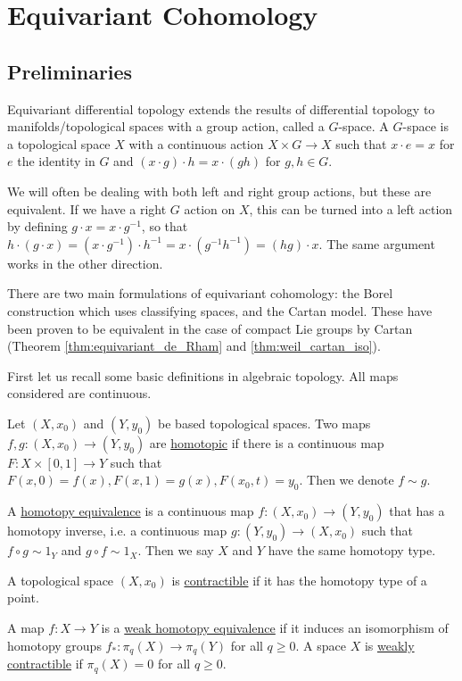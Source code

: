 \chapter{Equivariant Cohomology}
\label{chapter_equivariant}

\section{Preliminaries}
Equivariant differential topology extends the results of differential topology
to manifolds/topological spaces with a group action, called a $G$-space. A
$G$-space is a topological space $X$ with a continuous action $X\times G \to X$ 
such that $x\cdot e = x$ for $e$ the identity in  $G$ and $(x\cdot g) \cdot h =
x\cdot (gh)$ for $g,h\in G$. 

We will often be dealing with both left and right group actions, but these are
equivalent. If we have a right $G$ action on $X$, this can be turned into a left
action by defining  $g \cdot x = x \cdot g^{-1}$, so that $h\cdot (g\cdot x) =
(x\cdot g^{-1})\cdot h^{-1} = x\cdot (g^{-1}h^{-1}) = (hg)\cdot x$. The same
argument works in the other direction.


There are two main formulations of equivariant
cohomology: the Borel construction which uses classifying spaces, and the Cartan model.
These have been proven to be equivalent in the case of compact Lie groups 
by Cartan (Theorem \ref{thm:equivariant_de_Rham} and \ref{thm:weil_cartan_iso}). 

First let us recall some basic definitions in algebraic topology. All maps
considered are continuous.
\begin{defn}
	Let $(X,x_0)$ and $(Y,y_0)$ be based topological spaces. Two maps
	$f,g:(X,x_0)\to(Y,y_0)$ are \underline{homotopic} if there is a continuous
	map $F:X\times [0,1]\to Y$ such that
	$F(x,0)=f(x),F(x,1)=g(x),F(x_0,t)=y_0$. Then we denote $f\sim g$.

	A \underline{homotopy equivalence} is a continuous map $f:(X,x_0)\to(Y,y_0)$
	that has a homotopy inverse, i.e. a continuous map $g:(Y,y_0)\to(X,x_0)$
	such that $f\circ g \sim 1_Y$ and $g\circ f \sim 1_X$.
	Then we say $X$ and  $Y$ have the same homotopy type.

	A topological space $(X,x_0)$ is \underline{contractible} if it has the
	homotopy type of a point. 

	A map $f:X\to Y$ is a \underline{weak homotopy equivalence} if
	it induces an isomorphism of homotopy groups
	$f_*:\pi_q(X)\to\pi_q(Y)$ for all  $q\geq 0$. 
	A space $X$ is \underline{weakly contractible} if $\pi_q(X)=0$ for all  $q\geq 0$. 
\end{defn}

